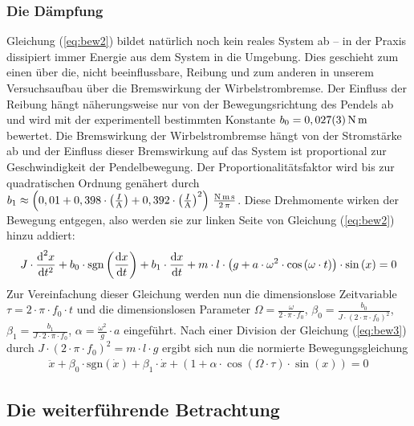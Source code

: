 \documentclass[numbers=noenddot,12pt,a4paper]{scrartcl}
\newcommand{\diff}{\textnormal{d}}
\newcommand{\ix}[1]{_\text{#1}}
\newcommand{\signum}{\text{sgn}}
\begin{document}
\subsubsection{Die Dämpfung}
Gleichung (\ref{eq:bew2}) bildet natürlich noch kein reales System ab -- in der Praxis dissipiert immer Energie aus dem System in die Umgebung. Dies geschieht zum einen über die, nicht beeinflussbare, Reibung und zum anderen in unserem Versuchsaufbau über die Bremswirkung der Wirbelstrombremse. Der Einfluss der Reibung hängt näherungsweise nur von der Bewegungsrichtung des Pendels ab und wird mit der experimentell bestimmten Konstante $b\ix{0}=\unit[0,027(3)]{N\,m}$ bewertet. Die Bremswirkung der Wirbelstrombremse hängt von der Stromstärke ab und der Einfluss dieser Bremswirkung auf das System ist proportional zur Geschwindigkeit der Pendelbewegung. Der Proportionalitätsfaktor wird bis zur quadratischen Ordnung genähert durch $b\ix{1}\approx\unit[\left(0,01+0,398\cdot\left(\frac{I}{\unit{A}}\right)+0,392\cdot\left(\frac{I}{\unit{A}}\right)^2\right)]{\frac{N\,m\,s}{2\,\pi}}$. Diese Drehmomente wirken der Bewegung entgegen, also werden sie zur linken Seite von Gleichung (\ref{eq:bew2}) hinzu addiert:
\begin{align}
J\cdot\frac{\diff^2 x}{\diff t^2}+b\ix{0}\cdot\signum\left(\frac{\diff x}{\diff t}\right)+b\ix{1}\cdot\frac{\diff x}{\diff t}+m\cdot l\cdot \left(g+a\cdot\omega^2\cdot\cos\left(\omega\cdot t\right)\right)\cdot\sin\left(x\right)=0\label{eq:bew3}
\end{align}
Zur Vereinfachung dieser Gleichung werden nun die dimensionslose Zeitvariable $\tau=2\cdot\pi\cdot f\ix{0}\cdot t$ und die dimensionslosen Parameter $\Omega=\frac{\omega}{2\cdot\pi\cdot f\ix{0}}$, $\beta\ix{0}=\frac{b\ix{0}}{J\cdot\left(2\cdot\pi\cdot f\ix{0}\right)^2}$,  $\beta\ix{1}=\frac{b\ix{1}}{J\cdot2\cdot\pi\cdot f\ix{0}}$, $\alpha=\frac{\omega^2}{g}\cdot a$ eingeführt. Nach einer Division der Gleichung (\ref{eq:bew3}) durch $J\cdot\left(2\cdot\pi\cdot f\ix{0}\right)^2=m\cdot l\cdot g$ ergibt sich nun die normierte Bewegungsgleichung
\begin{align}
	\ddot{x}+\beta\ix{0}\cdot\signum(\dot{x})+\beta\ix{1}\cdot \dot{x}+\left(1+\alpha\cdot\cos\left(\Omega\cdot\tau\right)\cdot\sin\left(x\right)\right)=0\label{eq:bew4}
\end{align}
\subsection{Die weiterführende Betrachtung}
\end{document}
